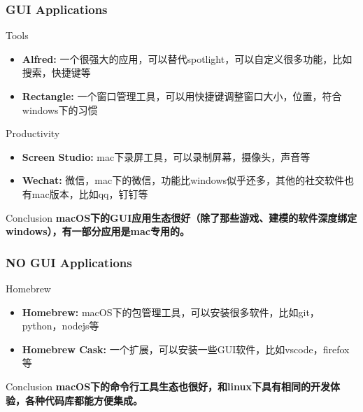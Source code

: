 \documentclass{beamer}
\begin{document}
\begin{frame}
    \frametitle{GUI Applications}
    \begin{block}{Tools}
        \begin{itemize}
            \item \textbf{Alfred:} 一个很强大的应用，可以替代spotlight，可以自定义很多功能，比如搜索，快捷键等
            \item \textbf{Rectangle:} 一个窗口管理工具，可以用快捷键调整窗口大小，位置，符合windows下的习惯
        \end{itemize}
    \end{block}
    \begin{block}{Productivity}
        \begin{itemize}
            \item \textbf{Screen Studio:} mac下录屏工具，可以录制屏幕，摄像头，声音等
            \item \textbf{Wechat:} 微信，mac下的微信，功能比windows似乎还多，其他的社交软件也有mac版本，比如qq，钉钉等
        \end{itemize}
    \end{block}

    \begin{alertblock}{Conclusion}
        \textbf{macOS下的GUI应用生态很好（除了那些游戏、建模的软件深度绑定windows），有一部分应用是mac专用的。}
    \end{alertblock}
\end{frame}

\begin{frame}
    \frametitle{NO GUI Applications}
    \begin{block}{Homebrew}
        \begin{itemize}
            \item \textbf{Homebrew:} macOS下的包管理工具，可以安装很多软件，比如git，python，nodejs等
            \item \textbf{Homebrew Cask:} 一个扩展，可以安装一些GUI软件，比如vscode，firefox等
        \end{itemize}
    \end{block}
    \begin{alertblock}{Conclusion}
        \textbf{macOS下的命令行工具生态也很好，和linux下具有相同的开发体验，各种代码库都能方便集成。}
        
    \end{alertblock}
\end{frame}
\end{document}
